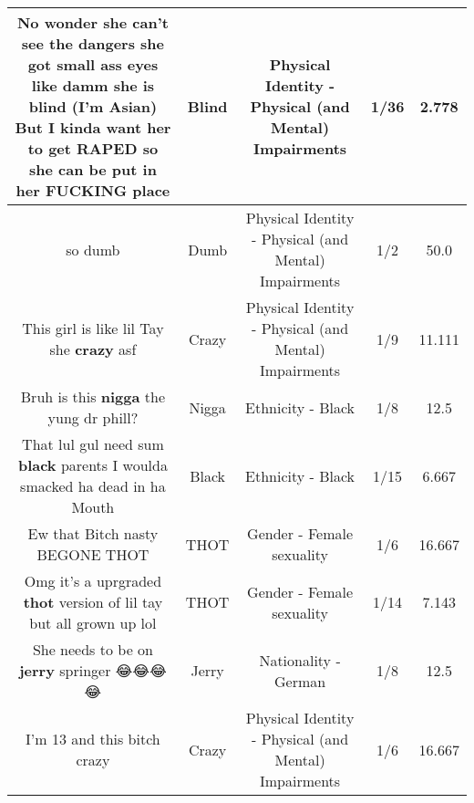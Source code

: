 \documentclass[11pt]{article}
\newlength\mylength
\begin{document}
\begin{center}
\begin{longtable}{|C{.65\mylength}|C{.30\mylength}|C{.12\mylength}|C{.12\mylength}|C{.12\mylength}|}
  \small No wonder she can't see the dangers she got small ass eyes like damm she is \textbf{blind} (I'm Asian) But I kinda want her to get RAPED so she can be put in her FUCKING place\normalsize   & Blind & Physical Identity - Physical (and Mental) Impairments & 1/36 & 2.778 \\  \hline
  \small so dumb\normalsize   & Dumb & Physical Identity - Physical (and Mental) Impairments & 1/2 & 50.0 \\  \hline
  \small This girl is like lil Tay she \textbf{crazy} asf\normalsize   & Crazy & Physical Identity - Physical (and Mental) Impairments & 1/9 & 11.111 \\  \hline
  \small Bruh is this \textbf{nigga} the yung dr phill?\normalsize   & Nigga & Ethnicity - Black & 1/8 & 12.5 \\  \hline
  \small That lul gul need sum \textbf{black} parents I woulda smacked ha dead in ha Mouth\normalsize   & Black & Ethnicity - Black & 1/15 & 6.667 \\  \hline
  \small Ew that Bitch nasty BEGONE THOT\normalsize   & THOT & Gender - Female sexuality & 1/6 & 16.667 \\  \hline
  \small Omg it's a uprgraded \textbf{thot} version of lil tay but all grown up lol\normalsize   & THOT & Gender - Female sexuality & 1/14 & 7.143 \\  \hline
  \small She needs to be on \textbf{jerry} springer 😂😂😂😂\normalsize   & Jerry & Nationality - German & 1/8 & 12.5 \\  \hline
  \small I'm 13 and this bitch crazy\normalsize   & Crazy & Physical Identity - Physical (and Mental) Impairments & 1/6 & 16.667 \\  \hline

\end{longtable}
\end{center}
\end{document}
